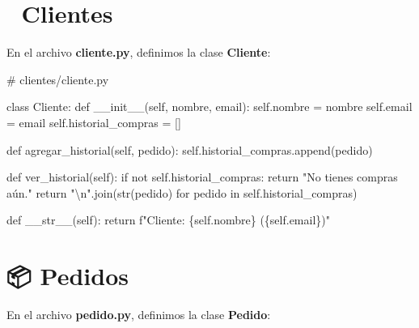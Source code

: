 \documentclass[
  a4paper,
  DIV=11,
  numbers=noendperiod,
  onepage,
  openany]{scrreprt}
\newenvironment{Shaded}{\begin{snugshade}}{\end{snugshade}}
\newcommand{\BuiltInTok}[1]{\textcolor[rgb]{0.00,0.23,0.31}{#1}}
\newcommand{\CharTok}[1]{\textcolor[rgb]{0.13,0.47,0.30}{#1}}
\newcommand{\CommentTok}[1]{\textcolor[rgb]{0.37,0.37,0.37}{#1}}
\newcommand{\ControlFlowTok}[1]{\textcolor[rgb]{0.00,0.23,0.31}{#1}}
\newcommand{\FunctionTok}[1]{\textcolor[rgb]{0.28,0.35,0.67}{#1}}
\newcommand{\KeywordTok}[1]{\textcolor[rgb]{0.00,0.23,0.31}{#1}}
\newcommand{\NormalTok}[1]{\textcolor[rgb]{0.00,0.23,0.31}{#1}}
\newcommand{\OperatorTok}[1]{\textcolor[rgb]{0.37,0.37,0.37}{#1}}
\newcommand{\SpecialCharTok}[1]{\textcolor[rgb]{0.37,0.37,0.37}{#1}}
\newcommand{\SpecialStringTok}[1]{\textcolor[rgb]{0.13,0.47,0.30}{#1}}
\newcommand{\StringTok}[1]{\textcolor[rgb]{0.13,0.47,0.30}{#1}}
\newcommand{\VariableTok}[1]{\textcolor[rgb]{0.07,0.07,0.07}{#1}}
\begin{document}
\section{👤 Clientes}\label{clientes}

En el archivo \textbf{cliente.py}, definimos la clase \textbf{Cliente}:

\begin{Shaded}
\begin{Highlighting}[]
\CommentTok{\# clientes/cliente.py}

\KeywordTok{class}\NormalTok{ Cliente:}
    \KeywordTok{def} \FunctionTok{\_\_init\_\_}\NormalTok{(}\VariableTok{self}\NormalTok{, nombre, email):}
        \VariableTok{self}\NormalTok{.nombre }\OperatorTok{=}\NormalTok{ nombre}
        \VariableTok{self}\NormalTok{.email }\OperatorTok{=}\NormalTok{ email}
        \VariableTok{self}\NormalTok{.historial\_compras }\OperatorTok{=}\NormalTok{ []}

    \KeywordTok{def}\NormalTok{ agregar\_historial(}\VariableTok{self}\NormalTok{, pedido):}
        \VariableTok{self}\NormalTok{.historial\_compras.append(pedido)}

    \KeywordTok{def}\NormalTok{ ver\_historial(}\VariableTok{self}\NormalTok{):}
        \ControlFlowTok{if} \KeywordTok{not} \VariableTok{self}\NormalTok{.historial\_compras:}
            \ControlFlowTok{return} \StringTok{"No tienes compras aún."}
        \ControlFlowTok{return} \StringTok{"}\CharTok{\textbackslash{}n}\StringTok{"}\NormalTok{.join(}\BuiltInTok{str}\NormalTok{(pedido) }\ControlFlowTok{for}\NormalTok{ pedido }\KeywordTok{in} \VariableTok{self}\NormalTok{.historial\_compras)}

    \KeywordTok{def} \FunctionTok{\_\_str\_\_}\NormalTok{(}\VariableTok{self}\NormalTok{):}
        \ControlFlowTok{return} \SpecialStringTok{f"Cliente: }\SpecialCharTok{\{}\VariableTok{self}\SpecialCharTok{.}\NormalTok{nombre}\SpecialCharTok{\}}\SpecialStringTok{ (}\SpecialCharTok{\{}\VariableTok{self}\SpecialCharTok{.}\NormalTok{email}\SpecialCharTok{\}}\SpecialStringTok{)"}
\end{Highlighting}
\end{Shaded}

\section{📦 Pedidos}\label{pedidos}

En el archivo \textbf{pedido.py}, definimos la clase \textbf{Pedido}:
\end{document}
